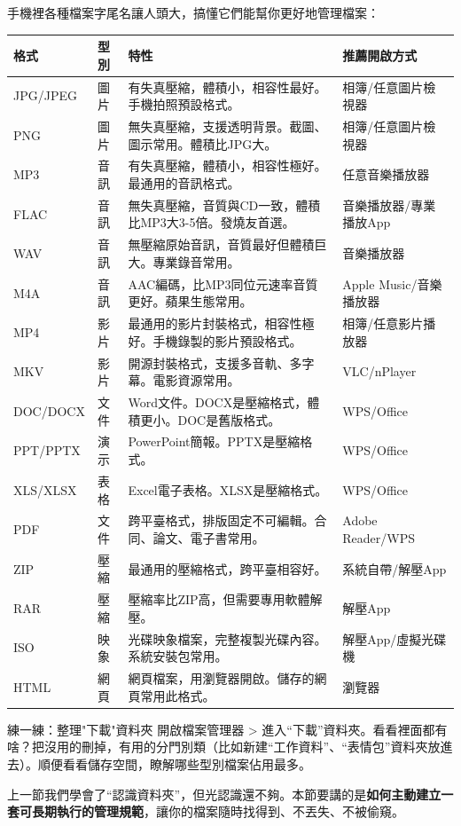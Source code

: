 
手機裡各種檔案字尾名讓人頭大，搞懂它們能幫你更好地管理檔案：

\begin{center}
\begin{tabularx}{\linewidth}{|X|X|X|X|}
\hline
\textbf{格式} & \textbf{型別} & \textbf{特性} & \textbf{推薦開啟方式} \tabularnewline
\hline
JPG/JPEG & 圖片 & 有失真壓縮，體積小，相容性最好。手機拍照預設格式。 & 相簿/任意圖片檢視器 \tabularnewline
PNG & 圖片 & 無失真壓縮，支援透明背景。截圖、圖示常用。體積比JPG大。 & 相簿/任意圖片檢視器 \tabularnewline
MP3 & 音訊 & 有失真壓縮，體積小，相容性極好。最通用的音訊格式。 & 任意音樂播放器 \tabularnewline
FLAC & 音訊 & 無失真壓縮，音質與CD一致，體積比MP3大3-5倍。發燒友首選。 & 音樂播放器/專業播放App \tabularnewline
WAV & 音訊 & 無壓縮原始音訊，音質最好但體積巨大。專業錄音常用。 & 音樂播放器 \tabularnewline
M4A & 音訊 & AAC編碼，比MP3同位元速率音質更好。蘋果生態常用。 & Apple Music/音樂播放器 \tabularnewline
MP4 & 影片 & 最通用的影片封裝格式，相容性極好。手機錄製的影片預設格式。 & 相簿/任意影片播放器 \tabularnewline
MKV & 影片 & 開源封裝格式，支援多音軌、多字幕。電影資源常用。 & VLC/nPlayer \tabularnewline
DOC/DOCX & 文件 & Word文件。DOCX是壓縮格式，體積更小。DOC是舊版格式。 & WPS/Office \tabularnewline
PPT/PPTX & 演示 & PowerPoint簡報。PPTX是壓縮格式。 & WPS/Office \tabularnewline
XLS/XLSX & 表格 & Excel電子表格。XLSX是壓縮格式。 & WPS/Office \tabularnewline
PDF & 文件 & 跨平臺格式，排版固定不可編輯。合同、論文、電子書常用。 & Adobe Reader/WPS \tabularnewline
ZIP & 壓縮 & 最通用的壓縮格式，跨平臺相容好。 & 系統自帶/解壓App \tabularnewline
RAR & 壓縮 & 壓縮率比ZIP高，但需要專用軟體解壓。 & 解壓App \tabularnewline
ISO & 映象 & 光碟映象檔案，完整複製光碟內容。系統安裝包常用。 & 解壓App/虛擬光碟機 \tabularnewline
HTML & 網頁 & 網頁檔案，用瀏覽器開啟。儲存的網頁常用此格式。 & 瀏覽器 \tabularnewline
\hline
\end{tabularx}
\end{center}

\begin{tcbpractice}{練一練：整理"下載"資料夾}
開啟檔案管理器 > 進入“下載”資料夾。看看裡面都有啥？把沒用的刪掉，有用的分門別類（比如新建“工作資料”、“表情包”資料夾放進去）。順便看看儲存空間，瞭解哪些型別檔案佔用最多。

\end{tcbpractice}


上一節我們學會了“認識資料夾”，但光認識還不夠。本節要講的是\textbf{如何主動建立一套可長期執行的管理規範}，讓你的檔案隨時找得到、不丟失、不被偷窺。

